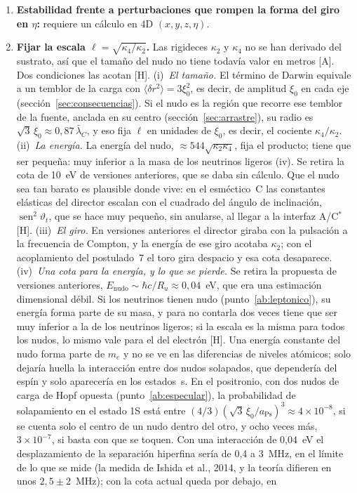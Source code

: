 \documentclass[11pt,a4paper]{article}
\newcommand{\st}[1]{\textup{[#1]}}
\newcommand{\Cst}{C\ensuremath{^{*}}}
\newcommand{\lbar}{\bar{\lambda}}
\begin{document}
\begin{enumerate}[label=\arabic*.,ref=\arabic*,leftmargin=*]
el tamaño necesario: la región ordenada tiene que ser unas cinco veces mayor que el nudo, del orden de una longitud de onda de Compton \st{N para el umbral, H para la traducción}.

\item \label{ab:estab4d}\textbf{Estabilidad frente a perturbaciones que rompen la forma del giro en $\eta$:} requiere un cálculo en 4D $(x,y,z,\eta)$.

\item \label{ab:escala}\textbf{Fijar la escala $\ell=\sqrt{\kappa_4/\kappa_2}$.} Las rigideces $\kappa_2$ y $\kappa_4$ no se han derivado del sustrato, así que el tamaño del nudo no tiene todavía valor en metros \st{A}. Dos condiciones las acotan \st{H}. (i)~\emph{El tamaño.} El término de Darwin equivale a un temblor de la carga con $\langle\delta r^2\rangle=3\xi_0^2$, es decir, de amplitud $\xi_0$ en cada eje (sección~\ref{sec:consecuencias}). Si el nudo es la región que recorre ese temblor de la fuente, anclada en su centro (sección~\ref{sec:arrastre}), su radio es $\sqrt3\,\xi_0\approx0,87\,\lbar_C$, y eso fija $\ell$ en unidades de $\xi_0$, es decir, el cociente $\kappa_4/\kappa_2$. (ii)~\emph{La energía.} La energía del nudo, $\approx544\sqrt{\kappa_2\kappa_4}$, fija el producto; tiene que ser pequeña: muy inferior a la masa de los neutrinos ligeros (iv). Se retira la cota de 10~eV de versiones anteriores, que se daba sin cálculo. Que el nudo sea tan barato es plausible donde vive: en el esméctico~C las constantes elásticas del director escalan con el cuadrado del ángulo de inclinación, $\operatorname{sen}^2\vartheta_t$, que se hace muy pequeño, sin anularse, al llegar a la interfaz A/\Cst{} \st{H}. (iii)~\emph{El giro.} En versiones anteriores el director giraba con la pulsación a la frecuencia de Compton, y la energía de ese giro acotaba $\kappa_2$; con el acoplamiento del postulado~7 el toro gira despacio y esa cota desaparece. (iv)~\emph{Una cota para la energía, y lo que se pierde.} Se retira la propuesta de versiones anteriores, $E_{\mathrm{nudo}}\sim\hbar c/R_u\approx0,04$~eV, que era una estimación dimensional débil. Si los neutrinos tienen nudo (punto~\ref{ab:leptonico}), su energía forma parte de su masa, y para no contarla dos veces tiene que ser muy inferior a la de los neutrinos ligeros; si la escala es la misma para todos los nudos, lo mismo vale para el del electrón \st{H}. Una energía constante del nudo forma parte de $m_e$ y no se ve en las diferencias de niveles atómicos; solo dejaría huella la interacción entre dos nudos solapados, que dependería del espín y solo aparecería en los estados~s. En el positronio, con dos nudos de carga de Hopf opuesta (punto~\ref{ab:especular}), la probabilidad de solapamiento en el estado 1S está entre $(4/3)(\sqrt3\,\xi_0/a_{\mathrm{Ps}})^3\approx4\times10^{-8}$, si se cuenta solo el centro de un nudo dentro del otro, y ocho veces más, $3\times10^{-7}$, si basta con que se toquen. Con una interacción de 0,04~eV el desplazamiento de la separación hiperfina sería de 0,4 a 3~MHz, en el límite de lo que se mide (la medida de Ishida et al., 2014, y la teoría difieren en unos $2,5\pm2$~MHz); con la cota actual queda por debajo, en 
\end{enumerate}
\end{document}
